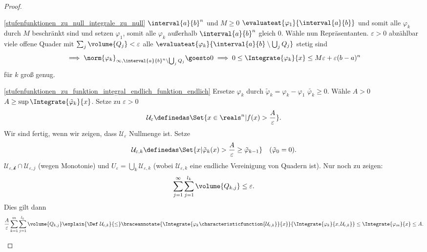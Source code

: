 \begin{proof}
  \begin{proofdescription}
    \item[\ref{stufenfunktionen_zu_null_integrale_zu_null}] \texists \( \interval{a}{b}^n \) und \texists \( M\geq 0 \) \sd \( \evaluateat{\varphi_1}{\interval{a}{b}} \) und somit alle \( \varphi_k \) durch \( M \) beschränkt sind und setzen \( \varphi_1 \), somit alle \( \varphi_k \) außerhalb \( \interval{a}{b}^n \) gleich \( 0 \). Wähle nun Repräsentanten. \tforall  \( \varepsilon>0 \) \texists abzählbar viele offene Quader mit \( \sum_{j} \volume{Q_j}<\varepsilon \) \sd alle \( \evaluateat{\varphi_k}{\interval{a}{b}\setminus \bigcup_j Q_j} \) stetig sind 
    \begin{equation*}
      \implies \norm{\varphi_k}_{\infty,\interval{a}{b}^n\setminus \bigcup_j Q_j}\goesto 0\implies 0\leq \Integrate{\varphi_k}{x}\leq M\varepsilon+\varepsilon(b-a)^n
    \end{equation*}
    für \( k \) groß genug.
    \item[\ref{stufenfunktionen_zu_funktion_integral_endlich_funktion_endlich}] Ersetze \( \varphi_k\) durch \( \tilde{\varphi}_k=\varphi_k-\varphi_1 \) \timplies \( \tilde{\varphi_k}\geq 0 \). Wähle \( A>0 \) \sd \( A\geq \sup \Integrate{\tilde{\varphi}_k}{x} \). Setze zu \( \varepsilon>0 \)
    \begin{equation*}
        \mathcal{U}_{\varepsilon}\definedas \Set{x\in \reals^n|f(x)>\frac{A}{\varepsilon}}.
    \end{equation*}
    Wir sind fertig, wenn wir zeigen, dass \( \mathcal{U}_{\varepsilon} \) Nullmenge ist. Setze
    \begin{equation*}
      \mathcal{U}_{\varepsilon,k}\definedas \Set{x|\tilde{\varphi}_k(x)>\frac{A}{\varepsilon}\geq \tilde{\varphi}_{k-1}}\quad (\tilde{\varphi}_0=0).
    \end{equation*}
    \timplies \( \mathcal{U_{\varepsilon,k}}\cap \mathcal{U}_{\varepsilon,j} \) (wegen Monotonie) und \( U_{\varepsilon}=\bigcup_k \mathcal{U}_{\varepsilon,k} \) (wobei \( \mathcal{U}_{\varepsilon,k} \) eine endliche Vereinigung von Quadern ist). Nur noch zu zeigen:
    \begin{equation*}
      \sum_{j=1}^{\infty}\sum_{j=1}^{l_k}\volume{Q_{k,j}}\leq \varepsilon.
    \end{equation*}
    Dies gilt dann
    \begin{equation*}
      \frac{A}{\varepsilon}\sum_{k=1}^{m}\sum_{j=1}^{l_k}\volume{Q_{k,j}}\explain{\text{\Def }\mathcal{U}_{\varepsilon,k}}{\leq}\braceannotate{\Integrate{\varphi_k \characteristicfunction{\mathcal{U}_{\varepsilon,k}}}{x}}{\Integrate{\varphi_k}{x,\mathcal{U}_{\varepsilon,k}}}\leq \Integrate{\varphi_m}{x}\leq A.
    \end{equation*}
  \end{proofdescription}
  
\end{proof}
